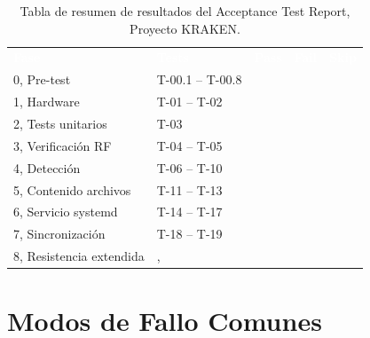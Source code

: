 \begin{table}[h]
    \centering
    \renewcommand{\arraystretch}{2.0} %
    \begin{tabularx}{\textwidth}{l X p{1.2cm} p{1.2cm} p{1.2cm}}
        \rowcolor{deyposcolor}
        \textbf{\textcolor{white}{Fase}} &
        \textbf{\textcolor{white}{Tests}} &
        \centering\textbf{\textcolor{white}{Pass}} &
        \centering\textbf{\textcolor{white}{Fail}} &
        \centering\textbf{\textcolor{white}{Skip}} \tabularnewline
        
        0, Pre-test             & T-00.1 – T-00.8 & & & \\
        \rowcolor[gray]{0.95}
        1, Hardware             & T-01 – T-02     & & & \\
        2, Tests unitarios      & T-03            & & & \\
        \rowcolor[gray]{0.95}
        3, Verificación RF      & T-04 – T-05     & & & \\
        4, Detección            & T-06 – T-10     & & & \\
        \rowcolor[gray]{0.95}
        5, Contenido archivos   & T-11 – T-13     & & & \\
        6, Servicio systemd     & T-14 – T-17     & & & \\
        \rowcolor[gray]{0.95}
        7, Sincronización       & T-18 – T-19     & & & \\
        8, Resistencia extendida &,              & & & \\
        \bottomrule
    \end{tabularx}
    \caption{Tabla de resumen de resultados del Acceptance Test Report, Proyecto KRAKEN.}
\end{table}

\section{Modos de Fallo Comunes}

